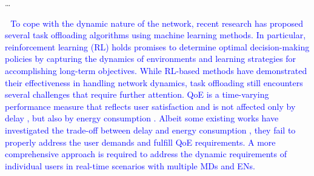 \documentclass[12pt,draftclsnofoot,onecolumn]{IEEEtran}
\newcommand{\rev}[1]{{\color{blue}#1}} %
\newcommand{\rev}[1]{#1}
\newenvironment{my}[2]%
{\begin{list}{}%
{\setlength{\rightmargin}{#1}\setlength{\leftmargin}{#2}}%


 \item[]{}

} {\end{list}}
\begin{document}
\begin{enumerate}
\begin{my}{1cm}{1cm}
	\rev{ 
		
		\dots
		
		\textcolor{blue}{\,\,\,\,To cope with the dynamic nature of the network, recent research has proposed several task offloading algorithms using machine learning methods. In particular, reinforcement learning (RL) \cite{mnih2015human} holds promises to determine optimal decision-making policies by capturing the dynamics of environments and learning strategies for accomplishing long-term objectives.
			While RL-based methods have demonstrated their effectiveness in handling network dynamics, task offloading still encounters several challenges that require further attention. 
			QoE is a time-varying performance measure that reflects user satisfaction and is not affected only by delay \cite{guo2022energy}, but also by energy consumption \cite{tang2022uav}. Albeit some existing works have investigated the trade-off between delay and energy consumption \cite{li2022joint}, they fail to properly address the user demands and fulfill QoE requirements. A more comprehensive approach is required to address the dynamic requirements of individual users in real-time scenarios with multiple MDs and ENs.} \vspace{2mm}
		
		
		
}
\end{my}
\end{enumerate}
\end{document}
